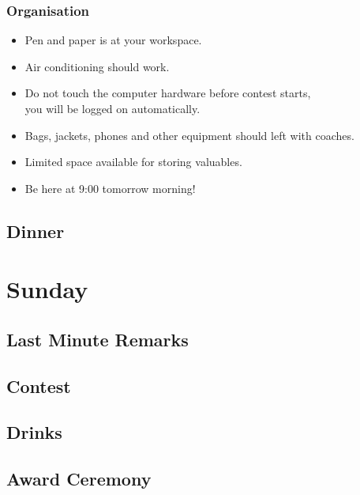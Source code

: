 \documentclass[t]{beamer}
\begin{document}
\begin{frame}
    \frametitle{Organisation}
    \begin{itemize}
        \item Pen and paper is at your workspace.
        \item Air conditioning should work.
        \item Do not touch the computer hardware before contest starts,\\
        	you will be logged on automatically.
        \item Bags, jackets, phones and other equipment should left with coaches.
        \item Limited space available for storing valuables.
        \item Be here at 9:00 tomorrow morning!
     \end{itemize}
\end{frame}

\QuestionsFrame
\subsection{Dinner}
\section{Sunday}
\subsection{Last Minute Remarks}
\subsection{Contest}
\subsection{Drinks}
\subsection{Award Ceremony}
\QuestionsFrame
\end{document}

